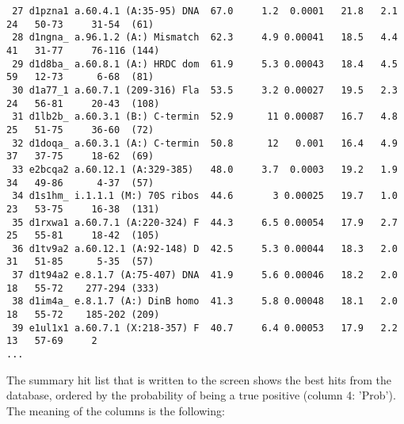 \documentclass[11pt,a4paper]{article}
\begin{document}
\begin{verbatim}
 27 d1pzna1 a.60.4.1 (A:35-95) DNA  67.0     1.2  0.0001   21.8   2.1   24   50-73     31-54  (61)
 28 d1ngna_ a.96.1.2 (A:) Mismatch  62.3     4.9 0.00041   18.5   4.4   41   31-77     76-116 (144)
 29 d1d8ba_ a.60.8.1 (A:) HRDC dom  61.9     5.3 0.00043   18.4   4.5   59   12-73      6-68  (81)
 30 d1a77_1 a.60.7.1 (209-316) Fla  53.5     3.2 0.00027   19.5   2.3   24   56-81     20-43  (108)
 31 d1lb2b_ a.60.3.1 (B:) C-termin  52.9      11 0.00087   16.7   4.8   25   51-75     36-60  (72)
 32 d1doqa_ a.60.3.1 (A:) C-termin  50.8      12   0.001   16.4   4.9   37   37-75     18-62  (69)
 33 e2bcqa2 a.60.12.1 (A:329-385)   48.0     3.7  0.0003   19.2   1.9   34   49-86      4-37  (57)
 34 d1s1hm_ i.1.1.1 (M:) 70S ribos  44.6       3 0.00025   19.7   1.0   23   53-75     16-38  (131)
 35 d1rxwa1 a.60.7.1 (A:220-324) F  44.3     6.5 0.00054   17.9   2.7   25   55-81     18-42  (105)
 36 d1tv9a2 a.60.12.1 (A:92-148) D  42.5     5.3 0.00044   18.3   2.0   31   51-85      5-35  (57)
 37 d1t94a2 e.8.1.7 (A:75-407) DNA  41.9     5.6 0.00046   18.2   2.0   18   55-72    277-294 (333)
 38 d1im4a_ e.8.1.7 (A:) DinB homo  41.3     5.8 0.00048   18.1   2.0   18   55-72    185-202 (209)
 39 e1ul1x1 a.60.7.1 (X:218-357) F  40.7     6.4 0.00053   17.9   2.2   13   57-69     2
...
\end{verbatim}\normalsize
 

The summary hit list that is written to the screen shows the best hits from the 
database, ordered by the probability of being a true positive (column 4: 'Prob'). 
The meaning of the columns is the following:
\vspace{5mm}
\end{document}

